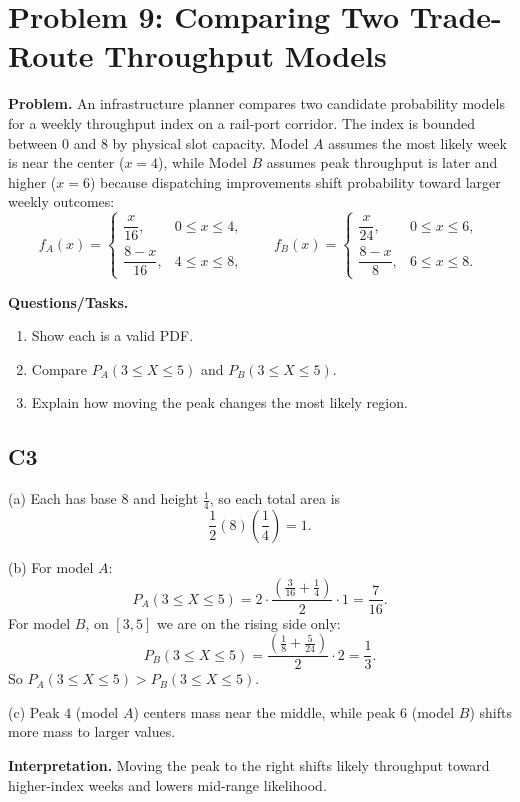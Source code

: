 \section{Problem 9: Comparing Two Trade-Route Throughput Models}

\textbf{Problem.}
An infrastructure planner compares two candidate probability models for a weekly throughput index on a rail-port corridor. The index is bounded between $0$ and $8$ by physical slot capacity. Model $A$ assumes the most likely week is near the center ($x=4$), while Model $B$ assumes peak throughput is later and higher ($x=6$) because dispatching improvements shift probability toward larger weekly outcomes:
\[
f_A(x)=\begin{cases}
\dfrac{x}{16}, & 0\le x\le 4,\\
\dfrac{8-x}{16}, & 4\le x\le 8,
\end{cases}
\qquad
f_B(x)=\begin{cases}
\dfrac{x}{24}, & 0\le x\le 6,\\
\dfrac{8-x}{8}, & 6\le x\le 8.
\end{cases}
\]

\textbf{Questions/Tasks.}
\begin{enumerate}[label=(\alph*)]
\item Show each is a valid PDF.
\item Compare $P_A(3\le X\le 5)$ and $P_B(3\le X\le 5)$.
\item Explain how moving the peak changes the most likely region.
\end{enumerate}

\subsection*{C3}
(a) Each has base $8$ and height $\frac14$, so each total area is
\[
\frac12(8)\left(\frac14\right)=1.
\]

(b) For model $A$:
\[
P_A(3\le X\le 5)=2\cdot\frac{\left(\frac{3}{16}+\frac14\right)}{2}\cdot1=\frac{7}{16}.
\]
For model $B$, on $[3,5]$ we are on the rising side only:
\[
P_B(3\le X\le 5)=\frac{\left(\frac18+\frac{5}{24}\right)}{2}\cdot2=\frac13.
\]
So $P_A(3\le X\le 5)>P_B(3\le X\le 5)$.

(c) Peak $4$ (model $A$) centers mass near the middle, while peak $6$ (model $B$) shifts more mass to larger values.

\textbf{Interpretation.}
Moving the peak to the right shifts likely throughput toward higher-index weeks and lowers mid-range likelihood.

